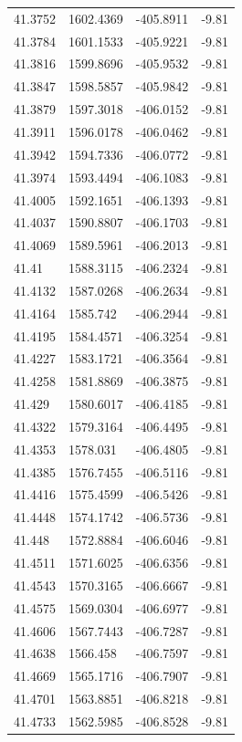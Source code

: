 \begin{table}[H]
\begin{tabular}{llll}
41.3752 & 1602.4369 & -405.8911 & -9.81 \\
41.3784 & 1601.1533 & -405.9221 & -9.81 \\
41.3816 & 1599.8696 & -405.9532 & -9.81 \\
41.3847 & 1598.5857 & -405.9842 & -9.81 \\
41.3879 & 1597.3018 & -406.0152 & -9.81 \\
41.3911 & 1596.0178 & -406.0462 & -9.81 \\
41.3942 & 1594.7336 & -406.0772 & -9.81 \\
41.3974 & 1593.4494 & -406.1083 & -9.81 \\
41.4005 & 1592.1651 & -406.1393 & -9.81 \\
41.4037 & 1590.8807 & -406.1703 & -9.81 \\
41.4069 & 1589.5961 & -406.2013 & -9.81 \\
41.41 & 1588.3115 & -406.2324 & -9.81 \\
41.4132 & 1587.0268 & -406.2634 & -9.81 \\
41.4164 & 1585.742 & -406.2944 & -9.81 \\
41.4195 & 1584.4571 & -406.3254 & -9.81 \\
41.4227 & 1583.1721 & -406.3564 & -9.81 \\
41.4258 & 1581.8869 & -406.3875 & -9.81 \\
41.429 & 1580.6017 & -406.4185 & -9.81 \\
41.4322 & 1579.3164 & -406.4495 & -9.81 \\
41.4353 & 1578.031 & -406.4805 & -9.81 \\
41.4385 & 1576.7455 & -406.5116 & -9.81 \\
41.4416 & 1575.4599 & -406.5426 & -9.81 \\
41.4448 & 1574.1742 & -406.5736 & -9.81 \\
41.448 & 1572.8884 & -406.6046 & -9.81 \\
41.4511 & 1571.6025 & -406.6356 & -9.81 \\
41.4543 & 1570.3165 & -406.6667 & -9.81 \\
41.4575 & 1569.0304 & -406.6977 & -9.81 \\
41.4606 & 1567.7443 & -406.7287 & -9.81 \\
41.4638 & 1566.458 & -406.7597 & -9.81 \\
41.4669 & 1565.1716 & -406.7907 & -9.81 \\
41.4701 & 1563.8851 & -406.8218 & -9.81 \\
41.4733 & 1562.5985 & -406.8528 & -9.81 \\

\end{tabular}
\end{table}
